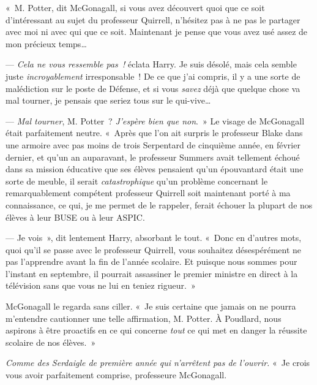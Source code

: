 «~M. Potter, dit McGonagall, si vous avez découvert quoi que ce soit d'intéressant au sujet du professeur Quirrell, n'hésitez pas à ne pas le partager avec moi ni avec qui que ce soit.
Maintenant je pense que vous avez usé assez de mon précieux temps…

--- \emph{Cela ne vous ressemble pas~!} éclata Harry.
Je suis désolé, mais cela semble juste \emph{incroyablement} irresponsable~!
De ce que j'ai compris, il y a une sorte de malédiction sur le poste de Défense, et si vous \emph{savez} déjà que quelque chose va mal tourner, je pensais que seriez tous sur le qui-vive…

--- \emph{Mal tourner}, M. Potter~?
\emph{J'espère bien que non}.~»
Le visage de McGonagall était parfaitement neutre.
«~Après que l'on ait surpris le professeur Blake dans une armoire avec pas moins de trois Serpentard de cinquième année, en février dernier, et qu'un an auparavant, le professeur Summers avait tellement échoué dans sa mission éducative que ses élèves pensaient qu'un épouvantard était une sorte de meuble, il serait \emph{catastrophique} qu'un problème concernant le remarquablement compétent professeur Quirrell soit maintenant porté à ma connaissance, ce qui, je me permet de le rappeler, ferait échouer la plupart de nos élèves à leur BUSE ou à leur ASPIC.

--- Je vois~», dit lentement Harry, absorbant le tout.
«~Donc en d'autres mots, quoi qu'il se passe avec le professeur Quirrell, vous souhaitez désespérément ne pas l'apprendre avant la fin de l'année scolaire.
Et puisque nous sommes pour l'instant en septembre, il pourrait assassiner le premier ministre en direct à la télévision sans que vous ne lui en teniez rigueur.~»

McGonagall le regarda sans ciller.
«~Je suis certaine que jamais on ne pourra m'entendre cautionner une telle affirmation, M. Potter.
À Poudlard, nous aspirons à être proactifs en ce qui concerne \emph{tout} ce qui met en danger la réussite scolaire de nos élèves.~»

\emph{Comme des Serdaigle de première année qui n'arrêtent pas de l'ouvrir.}
«~Je crois vous avoir parfaitement comprise, professeure McGonagall.

